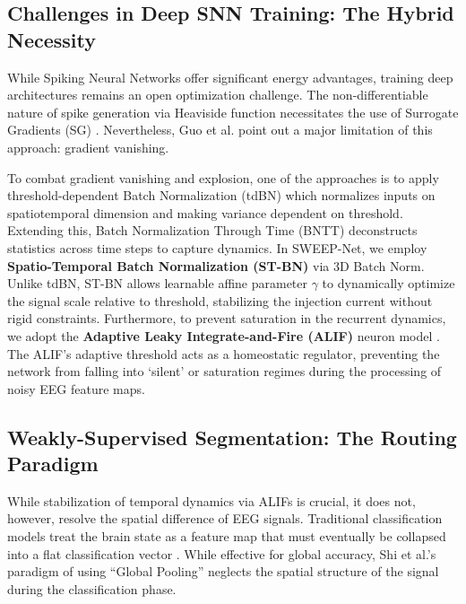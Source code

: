 \documentclass[conference]{IEEEtran}
\begin{document}
\subsection{Challenges in Deep SNN Training: The Hybrid Necessity}
While Spiking Neural Networks offer significant energy advantages, training deep architectures remains an open optimization challenge. The non-differentiable nature of spike generation via Heaviside function necessitates the use of Surrogate Gradients (SG) \cite{Neftchi2019, Wu2022, Rathi2023}. Nevertheless, Guo et al. \cite{Guo2024} point out a major limitation of this approach: gradient vanishing. 

To combat gradient vanishing and explosion, one of the approaches is to apply threshold-dependent Batch Normalization (tdBN) \cite{Zheng2021} which normalizes inputs on spatiotemporal dimension and making variance dependent on threshold. Extending this, Batch Normalization Through Time (BNTT) \cite{Kim2021} deconstructs statistics across time steps to capture dynamics. In SWEEP-Net, we employ \textbf{Spatio-Temporal Batch Normalization (ST-BN)} via 3D Batch Norm. Unlike tdBN, ST-BN allows learnable affine parameter $\gamma$ to dynamically optimize the signal scale relative to threshold, stabilizing the injection current without rigid constraints. Furthermore, to prevent saturation in the recurrent dynamics, we adopt the \textbf{Adaptive Leaky Integrate-and-Fire (ALIF)} neuron model \cite{Brette2005}. The ALIF's adaptive threshold acts as a homeostatic regulator, preventing the network from falling into `silent' or saturation regimes during the processing of noisy EEG feature maps. 

\subsection{Weakly-Supervised Segmentation: The Routing Paradigm}
While stabilization of temporal dynamics via ALIFs is crucial, it does not, however, resolve the spatial difference of EEG signals. Traditional classification models treat the brain state as a feature map that must eventually be collapsed into a flat classification vector \cite{Zheng2015, Liu2016}. While effective for global accuracy, Shi et al.'s \cite{Shi2025} paradigm of using ``Global Pooling'' neglects the spatial structure of the signal during the classification phase.
\end{document}
